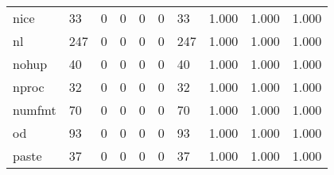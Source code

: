 \begin{longtable}{lp{1.3cm}p{1.3cm}p{1.3cm}p{1.3cm}p{1.3cm}p{1.3cm}p{1.3cm}p{1.3cm}p{1.3cm}}
nice      &                     33 &                                             0 &                                            0 &                                           0 &                                            0 &                                         33 &                                1.000 &                                  1.000 &                                1.000 \\
nl        &                    247 &                                             0 &                                            0 &                                           0 &                                            0 &                                        247 &                                1.000 &                                  1.000 &                                1.000 \\
nohup     &                     40 &                                             0 &                                            0 &                                           0 &                                            0 &                                         40 &                                1.000 &                                  1.000 &                                1.000 \\
nproc     &                     32 &                                             0 &                                            0 &                                           0 &                                            0 &                                         32 &                                1.000 &                                  1.000 &                                1.000 \\
numfmt    &                     70 &                                             0 &                                            0 &                                           0 &                                            0 &                                         70 &                                1.000 &                                  1.000 &                                1.000 \\
od        &                     93 &                                             0 &                                            0 &                                           0 &                                            0 &                                         93 &                                1.000 &                                  1.000 &                                1.000 \\
paste     &                     37 &                                             0 &                                            0 &                                           0 &                                            0 &                                         37 &                                1.000 &                                  1.000 &                                1.000 \\

\end{longtable}
